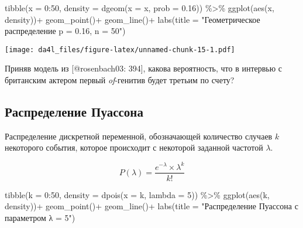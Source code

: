 \documentclass[
]{book}
\makeatletter
\newenvironment{Shaded}{\begin{snugshade}}{\end{snugshade}}
\newcommand{\AttributeTok}[1]{\textcolor[rgb]{0.77,0.63,0.00}{#1}}
\newcommand{\DecValTok}[1]{\textcolor[rgb]{0.00,0.00,0.81}{#1}}
\newcommand{\FloatTok}[1]{\textcolor[rgb]{0.00,0.00,0.81}{#1}}
\newcommand{\FunctionTok}[1]{\textcolor[rgb]{0.00,0.00,0.00}{#1}}
\newcommand{\NormalTok}[1]{#1}
\newcommand{\SpecialCharTok}[1]{\textcolor[rgb]{0.00,0.00,0.00}{#1}}
\newcommand{\StringTok}[1]{\textcolor[rgb]{0.31,0.60,0.02}{#1}}
\newenvironment{kframe}{%
    \medskip{}
    \setlength{\fboxsep}{.8em}
    \def\at@end@of@kframe{}%
    \ifinner\ifhmode%
    \def\at@end@of@kframe{\end{minipage}}%
    \begin{minipage}{\columnwidth}%
    \fi\fi%
    \def\FrameCommand##1{\hskip\@totalleftmargin \hskip-\fboxsep
    \colorbox{shadecolor}{##1}\hskip-\fboxsep
        \hskip-\linewidth \hskip-\@totalleftmargin \hskip\columnwidth}%
    \MakeFramed {\advance\hsize-\width
      \@totalleftmargin\z@ \linewidth\hsize
      \@setminipage}}%
  {\par\unskip\endMakeFramed%
    \at@end@of@kframe}
\newenvironment{rmdblock}[1]
  {
    \begin{itemize}
    \renewcommand{\labelitemi}{
      \raisebox{-.7\height}[0pt][0pt]{
        {\setkeys{Gin}{width=3em,keepaspectratio}\texttt{[image: images/\#1]}}
        }
        }
        \setlength{\fboxsep}{1em}
        \begin{kframe}
        \item
      }
      {
        \end{kframe}
        \end{itemize}
      }
\newenvironment{rmdtask}
      {\begin{rmdblock}{task}}
      {\end{rmdblock}}
\makeatother
\begin{document}
\begin{Shaded}
\begin{Highlighting}[]
\FunctionTok{tibble}\NormalTok{(}\AttributeTok{x =} \DecValTok{0}\SpecialCharTok{:}\DecValTok{50}\NormalTok{,}
       \AttributeTok{density =} \FunctionTok{dgeom}\NormalTok{(}\AttributeTok{x =}\NormalTok{ x, }\AttributeTok{prob =} \FloatTok{0.16}\NormalTok{)) }\SpecialCharTok{\%\textgreater{}\%} 
  \FunctionTok{ggplot}\NormalTok{(}\FunctionTok{aes}\NormalTok{(x, density))}\SpecialCharTok{+}
  \FunctionTok{geom\_point}\NormalTok{()}\SpecialCharTok{+}
  \FunctionTok{geom\_line}\NormalTok{()}\SpecialCharTok{+}
  \FunctionTok{labs}\NormalTok{(}\AttributeTok{title =} \StringTok{"Геометрическое распределение p = 0.16, n = 50"}\NormalTok{)}
\end{Highlighting}
\end{Shaded}

\texttt{[image: da4l\_files/figure-latex/unnamed-chunk-15-1.pdf]}

\begin{rmdtask}
Приняв модель из {[}@rosenbach03: 394{]}, какова вероятность, что в
интервью с британским актером первый \emph{of}-генитив будет третьим по
счету?
\end{rmdtask}

\hypertarget{ux440ux430ux441ux43fux440ux435ux434ux435ux43bux435ux43dux438ux435-ux43fux443ux430ux441ux441ux43eux43dux430}{%
\subsection{Распределение Пуассона}\label{ux440ux430ux441ux43fux440ux435ux434ux435ux43bux435ux43dux438ux435-ux43fux443ux430ux441ux441ux43eux43dux430}}

Распределение дискретной переменной, обозначающей количество случаев \(k\) некоторого события, которое происходит с некоторой заданной частотой \(\lambda\).

\[P(\lambda) = \frac{e^{-\lambda}\times\lambda^k}{k!}\]

\begin{Shaded}
\begin{Highlighting}[]
\FunctionTok{tibble}\NormalTok{(}\AttributeTok{k =} \DecValTok{0}\SpecialCharTok{:}\DecValTok{50}\NormalTok{,}
       \AttributeTok{density =} \FunctionTok{dpois}\NormalTok{(}\AttributeTok{x =}\NormalTok{ k, }\AttributeTok{lambda =} \DecValTok{5}\NormalTok{)) }\SpecialCharTok{\%\textgreater{}\%} 
  \FunctionTok{ggplot}\NormalTok{(}\FunctionTok{aes}\NormalTok{(k, density))}\SpecialCharTok{+}
  \FunctionTok{geom\_point}\NormalTok{()}\SpecialCharTok{+}
  \FunctionTok{geom\_line}\NormalTok{()}\SpecialCharTok{+}
  \FunctionTok{labs}\NormalTok{(}\AttributeTok{title =} \StringTok{"Распределение Пуассона с параметром λ = 5"}\NormalTok{)}
\end{Highlighting}
\end{Shaded}
\end{document}

